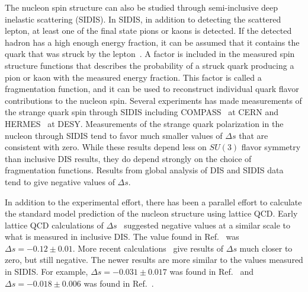   The nucleon spin structure can also be studied through semi-inclusive deep
  inelastic scattering (SIDIS). In SIDIS, in addition to detecting the
  scattered lepton, at least one of the final state pions or kaons is detected.
  If the detected hadron has a high enough energy fraction, it can be assumed
  that it contains the quark that was struck by the lepton~\cite{Bass:2007zzb}.
  A factor is included in the measured spin structure functions that describes
  the probability of a struck quark producing a pion or kaon with the measured
  energy fraction. This factor is called a fragmentation function, and it can
  be used to reconstruct individual quark flavor contributions to the nucleon
  spin. Several experiments has made measurements of the strange quark spin
  through SIDIS including COMPASS~\cite{Alekseev:2009ac,Alekseev:2010ub} at
  CERN and HERMES~\cite{Airapetian:2003ct,Airapetian:2004zf,Airapetian:2008qf}
  at DESY.  Measurements of the strange quark polarization in the nucleon
  through SIDIS tend to favor much smaller values of $\Delta s$ that are
  consistent with zero. While these results depend less on $SU(3)$ flavor
  symmetry than inclusive DIS results, they do depend strongly on the choice of
  fragmentation functions. Results from global analysis of DIS and SIDIS
  data~\cite{deFlorian:2008mr,deFlorian:2009vb,Blumlein:2010rn,Nocera:2014gqa,Leader:2014uua}
  tend to give negative values of $\Delta s$.
  
  In addition to the experimental effort, there has been a parallel effort to
  calculate the standard model prediction of the nucleon structure using
  lattice QCD. Early lattice QCD calculations of $\Delta
  s$~\cite{Savage:1996zd,Dong:1995rx} suggested negative values at a similar
  scale to what is measured in inclusive DIS. The value found
  in Ref.~\cite{Dong:1995rx} was $\Delta s = -0.12 \pm 0.01$. More recent
  calculations~\cite{QCDSF:2011aa,Engelhardt:2012gd,Abdel-Rehim:2015lha,Chambers:2015bka}
  give results of $\Delta s$ much closer to zero, but still negative. The newer
  results are more similar to the values measured in SIDIS. For example,
  $\Delta s = -0.031 \pm 0.017$ was found in Ref.~\cite{Engelhardt:2012gd} and
  $\Delta s = - 0.018 \pm 0.006$ was found in Ref.~\cite{Chambers:2015bka}.



